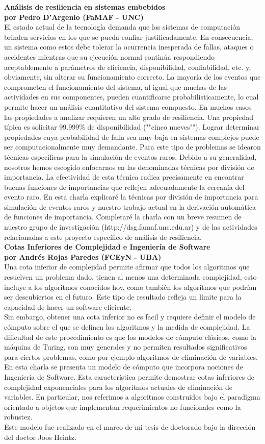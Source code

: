 \documentclass[12pt, a4paper]{article}
\newcommand{\charla}[3]{
	{\large\bf#1}\\
	{\bf por #2}\\
	#3\\
}
\begin{document}
\charla
{Análisis de resiliencia en sistemas embebidos}
{Pedro D'Argenio (FaMAF - UNC)}
{El estado actual de la tecnología demanda que los sistemas de computación brinden servicios en los que se pueda confiar justificadamente. En consecuencia, un sistema como estos debe tolerar la ocurrencia inesperada de fallas, ataques o accidentes mientras que su ejecución normal continúa respondiendo aceptablemente a parámetros de eficiencia, disponibilidad, confiabilidad, etc. y, obviamente, sin alterar su funcionamiento correcto. La mayoría de los eventos que comprometen el funcionamiento del sistema, al igual que muchas de las actividades en sus componentes, pueden cuantificarse probabilisticamente, lo cual permite hacer un análisis cuantitativo del sistema compuesto. En muchos casos las propiedades a analizar requieren un alto grado de resiliencia. Una propiedad típica es solicitar 99.999\% de disponibilidad (""cinco nueves""). Lograr determinar propiedades cuya probabilidad de falla sea muy baja en sistemas complejos puede ser computacionalmente muy demandante. Para este tipo de problemas se idearon técnicas específicas para la simulación de eventos raros. Debido a su generalidad, nosotros hemos escogido enfocarnos en las denominadas técnicas por división de importancia. La efectividad de esta técnica radica precisamente en encontrar buenas funciones de importancias que reflejen adecuadamente la cercanía del evento raro.
En esta charla explicaré la técnicas por división de importancia para simulación de eventos raros y nuestro trabajo actual en la derivación automática de funciones de importancia.
Completaré la charla con un breve resumen de nuestro grupo de investigación (http://dsg.famaf.unc.edu.ar) y de las actividades relacionadas a este proyecto específico de análisis de resiliencia.}

\charla
{Cotas Inferiores de Complejidad e Ingeniería de Software}
{Andrés Rojas Paredes (FCEyN - UBA)}
{Una cota inferior de complejidad permite afirmar que todos los algoritmos que resuelven un problema dado, tienen al menos una determinada complejidad, esto incluye a los algoritmos conocidos hoy, como también los algoritmos que podrían ser descubiertos en el futuro. Este tipo de resultado refleja un límite para la capacidad de hacer un software eficiente. \\
Sin embargo, obtener una cota inferior no es facil y requiere definir el modelo de cómputo sobre el que se definen los algoritmos y la medida de complejidad. La dificultad de este procedimiento es que los modelos de cómputo clásicos, como la máquina de Turing, son muy generales y no permiten resultados significativos para ciertos problemas, como por ejemplo algoritmos de eliminación de variables. \\
En esta charla se presenta un modelo de cómputo que incorpora nociones de Ingeniería de Software. Esta característica permite demostrar cotas inferiores de complejidad exponenciales para los algoritmos actuales de eliminación de variables. En particular, nos referimos a algoritmos construidos bajo el paradigma orientado a objetos que implementan requerimientos no funcionales como la robustez. \\
Este modelo fue realizado en el marco de mi tesis de doctorado bajo la dirección del doctor Joos Heintz.}
\end{document}
